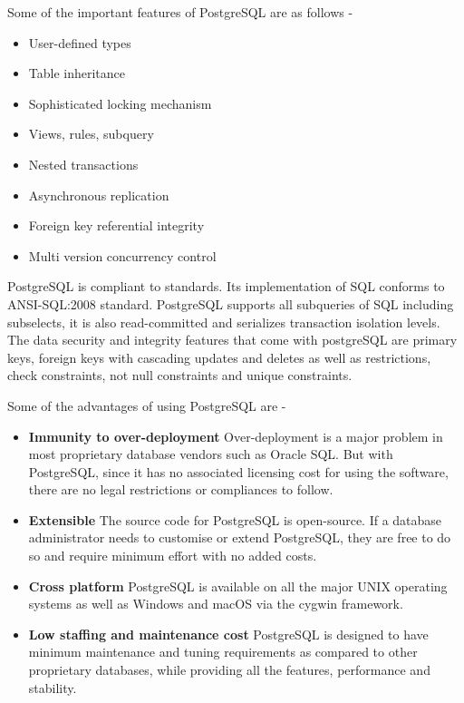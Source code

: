 \documentclass[../thesis.tex]{subfiles}
\begin{document}
Some of the important features of PostgreSQL are as follows -
\smallskip
\begin{itemize}
	\item User-defined types
	\smallskip
	\item Table inheritance
	\smallskip
	\item Sophisticated locking mechanism
	\smallskip
	\item Views, rules, subquery
	\smallskip
	\item Nested transactions
	\smallskip
	\item Asynchronous replication
	\smallskip
	\item Foreign key referential integrity
	\smallskip
	\item Multi version concurrency control	
\end{itemize}
PostgreSQL is compliant to standards. Its implementation of SQL conforms to ANSI-SQL:2008 standard. PostgreSQL supports all subqueries of SQL including subselects, it is also read-committed and serializes transaction isolation levels.
The data security and integrity features that come with postgreSQL are primary keys, foreign keys with cascading updates and deletes as well as restrictions, check constraints, not null constraints and unique constraints.
\newline

Some of the advantages of using PostgreSQL are - 
\begin{itemize}
	\item \textbf{Immunity to over-deployment}
	Over-deployment is a major problem in most proprietary database vendors such as Oracle SQL. But with PostgreSQL, since it has no associated licensing cost for using the software, there are no legal restrictions or compliances to follow.
	\smallskip
	\item \textbf{Extensible}
	The source code for PostgreSQL is open-source. If a database administrator needs to customise or extend PostgreSQL, they are free to do so and require minimum effort with no added costs.
	\item \textbf{Cross platform}
	PostgreSQL is available on all the major UNIX operating systems as well as Windows and macOS via the cygwin framework.
	\item \textbf{Low staffing and maintenance cost}
	PostgreSQL is designed to have minimum maintenance and tuning requirements as compared to other proprietary databases, while providing all the features, performance and stability.
\end{itemize}
\end{document}
